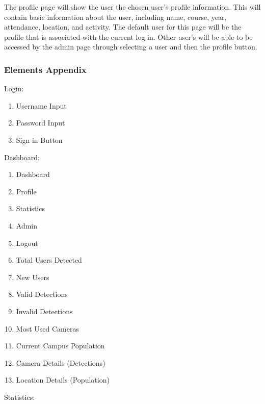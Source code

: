 \documentclass[
  english,
  a4paper,
,tablecaptionabove
]{scrartcl}
\providecommand{\tightlist}{%
  \setlength{\itemsep}{0pt}\setlength{\parskip}{0pt}}
\begin{document}
The profile page will show the user the chosen user's profile
information. This will contain basic information about the user,
including name, course, year, attendance, location, and activity. The
default user for this page will be the profile that is associated with
the current log-in. Other user's will be able to be accessed by the
admin page through selecting a user and then the profile button.\\
\newpage

\hypertarget{elements-appendix}{%
\subsubsection{Elements Appendix}\label{elements-appendix}}

Login:

\begin{enumerate}
\def\labelenumi{\arabic{enumi}.}
\tightlist
\item
  Username Input
\item
  Password Input\\
\item
  Sign in Button
\end{enumerate}

Dashboard:

\begin{enumerate}
\def\labelenumi{\arabic{enumi}.}
\tightlist
\item
  Dashboard
\item
  Profile
\item
  Statistics\\
\item
  Admin\\
\item
  Logout\\
\item
  Total Users Detected
\item
  New Users
\item
  Valid Detections
\item
  Invalid Detections
\item
  Most Used Cameras
\item
  Current Campus Population
\item
  Camera Details (Detections)
\item
  Location Details (Population)
\end{enumerate}

Statistics:
\end{document}

